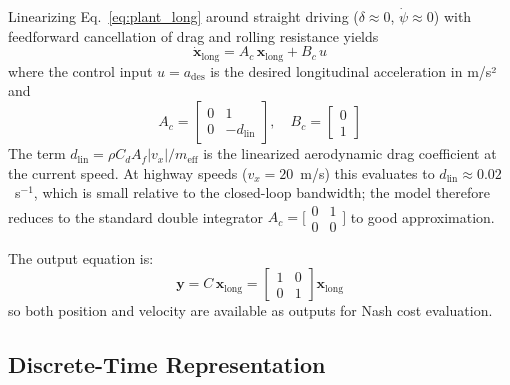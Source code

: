 \documentclass[12pt,a4paper,oneside]{report}
\begin{document}
Linearizing Eq.~\eqref{eq:plant_long} around straight driving ($\delta \approx 0$,
$\dot\psi \approx 0$) with feedforward cancellation of drag and rolling resistance
yields
\begin{equation}
\dot{\mathbf{x}}_{\text{long}} = A_c\,\mathbf{x}_{\text{long}} + B_c\,u
\label{eq:long_continuous}
\end{equation}
where the control input $u = a_{\text{des}}$ is the desired longitudinal acceleration
in m/s² and
\begin{equation}
A_c = \begin{bmatrix} 0 & 1 \\ 0 & -d_{\text{lin}} \end{bmatrix}, \quad
B_c = \begin{bmatrix} 0 \\ 1 \end{bmatrix}
\label{eq:long_matrices_continuous}
\end{equation}
The term $d_{\text{lin}} = \rho C_d A_f |v_x| / m_{\text{eff}}$ is the
linearized aerodynamic drag coefficient at the current speed. At highway speeds
($v_x = 20$~m/s) this evaluates to $d_{\text{lin}} \approx 0.02$~s$^{-1}$, which is
small relative to the closed-loop bandwidth; the model therefore reduces to the
standard double integrator $A_c = \bigl[\begin{smallmatrix}0&1\\0&0\end{smallmatrix}\bigr]$
to good approximation.

The output equation is:
\begin{equation}
\mathbf{y} = C\,\mathbf{x}_{\text{long}} = \begin{bmatrix} 1 & 0 \\ 0 & 1 \end{bmatrix}
\mathbf{x}_{\text{long}}
\label{eq:long_output}
\end{equation}
so both position and velocity are available as outputs for Nash cost evaluation.

\subsection{Discrete-Time Representation}
\end{document}

